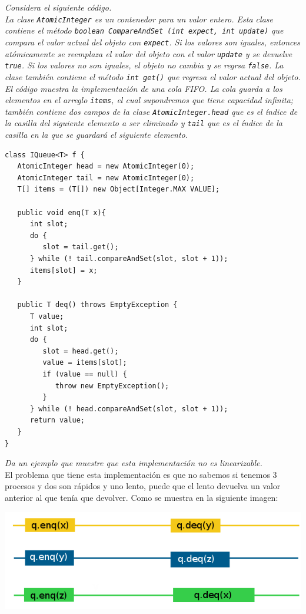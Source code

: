 \documentclass{article}
\begin{document}
\begin{enumerate}
{\item{\textsl{
      Considera el siguiente código.\\
      La clase \texttt{AtomicInteger} es un contenedor para un valor
      entero. Esta clase contiene el método \texttt{boolean
        CompareAndSet (int expect, int update)} que compara el valor
      actual del objeto con \texttt{expect}. Si los valores son
      iguales, entonces atómicamente se reemplaza el valor del objeto
      con el valor \texttt{update} y se devuelve \texttt{true}. Si los
      valores no son iguales, el objeto no cambia y se regrsa
      \texttt{false}. La clase también contiene el método \texttt{int
        get()} que regresa el valor actual del objeto.\\
      El código muestra la implementación de una cola FIFO. La cola
      guarda a los elementos en el arreglo \texttt{items}, el cual
      supondremos que tiene capacidad infinita; también contiene dos
      campos de la clase \texttt{AtomicInteger.head} que es el índice
      de la casilla del siguiente elemento a ser eliminado y
      \texttt{tail} que es el índice de la casilla en la que se
      guardará el siguiente elemento.
    }

    \renewcommand{\lstlistingname}{}
\begin{lstlisting}[frame=single]
class IQueue<T> f {
   AtomicInteger head = new AtomicInteger(0);
   AtomicInteger tail = new AtomicInteger(0);
   T[] items = (T[]) new Object[Integer.MAX VALUE];
   
   public void enq(T x){
      int slot;
      do {
         slot = tail.get();
      } while (! tail.compareAndSet(slot, slot + 1));
      items[slot] = x;
   }

   public T deq() throws EmptyException {
      T value;
      int slot;
      do {
         slot = head.get();
         value = items[slot];
         if (value == null) {
            throw new EmptyException();
         }
      } while (! head.compareAndSet(slot, slot + 1));
      return value;
   }
}
\end{lstlisting}
    \textsl{Da un ejemplo que muestre que esta implementación no es
      linearizable.}
    \\El problema que tiene esta implementación es que no sabemos si
    tenemos 3 procesos y dos son rápidos y uno lento, puede que el lento
    devuelva un valor anterior al que tenía que devolver. Como se muestra
    en la siguiente imagen:
    \\
    \begin{center}
      \includegraphics[scale=0.5]{figure2}
    \end{center} 
  }
}


\end{enumerate}
\end{document}
